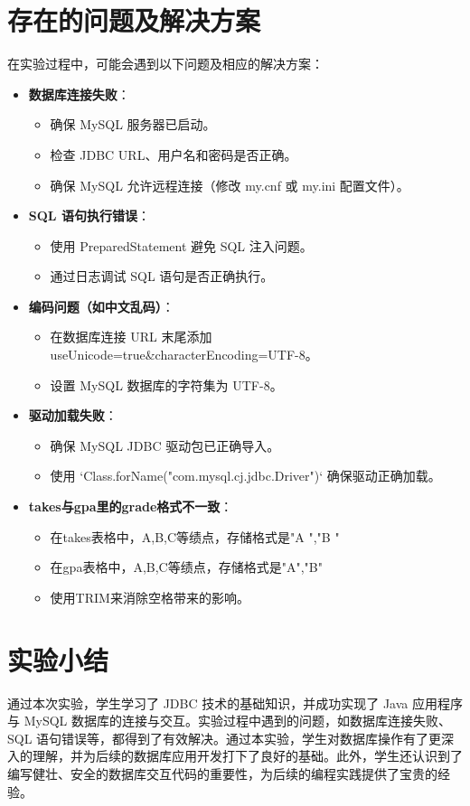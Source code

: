 \documentclass{article}
\begin{document}
	\section{存在的问题及解决方案}
	在实验过程中，可能会遇到以下问题及相应的解决方案：
	\begin{itemize}
		\item \textbf{数据库连接失败}：
		\begin{itemize}
			\item 确保 MySQL 服务器已启动。
			\item 检查 JDBC URL、用户名和密码是否正确。
			\item 确保 MySQL 允许远程连接（修改 my.cnf 或 my.ini 配置文件）。
		\end{itemize}
		\item \textbf{SQL 语句执行错误}：
		\begin{itemize}
			\item 使用 PreparedStatement 避免 SQL 注入问题。
			\item 通过日志调试 SQL 语句是否正确执行。
		\end{itemize}
		\item \textbf{编码问题（如中文乱码）}：
		\begin{itemize}
			\item 在数据库连接 URL 末尾添加 useUnicode=true\&characterEncoding=UTF-8。
			\item 设置 MySQL 数据库的字符集为 UTF-8。
		\end{itemize}
		\item \textbf{驱动加载失败}：
		\begin{itemize}
			\item 确保 MySQL JDBC 驱动包已正确导入。
			\item 使用 `Class.forName("com.mysql.cj.jdbc.Driver")` 确保驱动正确加载。
		\end{itemize}
		\item \textbf{takes与gpa里的grade格式不一致}：
		\begin{itemize}
			\item 在takes表格中，A,B,C等绩点，存储格式是"A ","B "
			\item 在gpa表格中，A,B,C等绩点，存储格式是"A","B"
			\item 使用TRIM来消除空格带来的影响。
		\end{itemize}
	\end{itemize}
	
	\section{实验小结}
	通过本次实验，学生学习了 JDBC 技术的基础知识，并成功实现了 Java 应用程序与 MySQL 数据库的连接与交互。实验过程中遇到的问题，如数据库连接失败、SQL 语句错误等，都得到了有效解决。通过本实验，学生对数据库操作有了更深入的理解，并为后续的数据库应用开发打下了良好的基础。此外，学生还认识到了编写健壮、安全的数据库交互代码的重要性，为后续的编程实践提供了宝贵的经验。
	
	
\end{document}

